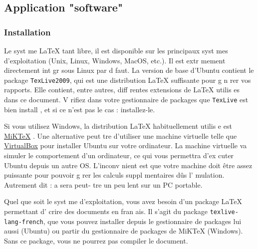 \documentclass{article}
\begin{document}
\subsection{Application "software"}
\subsubsection{Installation}
\label{sec:installation}
Le syst me \LaTeX{}  tant libre, il est disponible sur les principaux syst mes d'exploitation (Unix, Linux, Windows, MacOS, etc\@.). Il est extr mement directement int gr  sous Linux par d faut.
La version de base d'Ubuntu contient le package \texttt{TexLive2009}, qui est une distribution \LaTeX{} suffisante pour g n rer vos rapports. Elle contient, entre autres, diff rentes extensions de \LaTeX{} utilis es dans ce document. V rifiez dans votre gestionnaire de packages que \texttt{TexLive} est bien install , et si ce n'est pas le cas : installez-le.

Si vous utilisez Windows, la distribution \LaTeX{} habituellement utilis e est \href{http://miktex.org/}{MiKTeX} \cite{MiKTeX2015}. Une alternative peut  tre d'utiliser une machine virtuelle telle que \href{http://www.virtualbox.org/}{VirtualBox} \cite{Oracle2011} pour installer Ubuntu sur votre ordinateur. La machine virtuelle va simuler le comportement d'un ordinateur, ce qui vous permettra d'ex cuter Ubuntu depuis un autre OS. L'inconv nient est que votre machine doit \^etre assez puissante pour pouvoir g rer les calculs suppl mentaires d\^us   l' mulation. Autrement dit :  a sera peut- tre un peu lent sur un PC portable. 

Quel que soit le syst me d'exploitation, vous avez besoin d'un package \LaTeX{} permettant d' crire des documents en fran ais. Il s'agit du package \texttt{texlive-lang-french}, que vous pouvez installer depuis le gestionnaire de packages lui aussi (Ubuntu) ou   partir du gestionnaire de packages de MiKTeX (Windows). Sans ce package, vous ne pourrez pas compiler le document.
\end{document}
